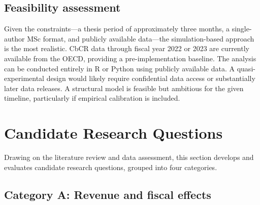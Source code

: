 \documentclass[12pt,a4paper]{article}
\begin{document}
\subsection{Feasibility assessment}

Given the constraints---a thesis period of approximately three months, a single-author MSc format, and publicly available data---the simulation-based approach is the most realistic.
CbCR data through fiscal year 2022 or 2023 are currently available from the OECD, providing a pre-implementation baseline.
The analysis can be conducted entirely in R or Python using publicly available data.
A quasi-experimental design would likely require confidential data access or substantially later data releases.
A structural model is feasible but ambitious for the given timeline, particularly if empirical calibration is included.


\section{Candidate Research Questions}\label{sec:questions}

Drawing on the literature review and data assessment, this section develops and evaluates candidate research questions, grouped into four categories.

\subsection{Category A: Revenue and fiscal effects}
\end{document}
